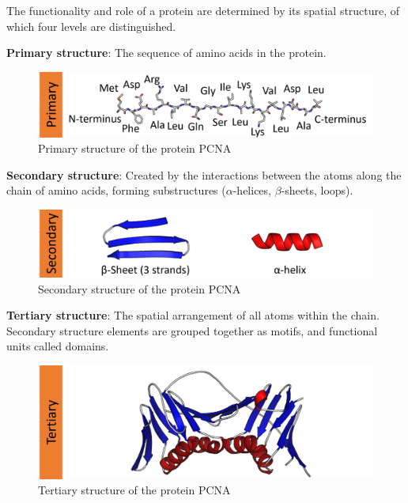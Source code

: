 The functionality and role of a protein are determined by its spatial structure, of which four levels are distinguished.

\textbf{Primary structure}: The sequence of amino acids in the protein.

\begin{figure}[H]
    \centering
    \includegraphics[width=\textwidth]{figures/bioinformatics/protein_structure_primary.png}
    \caption{Primary structure of the protein PCNA\cite{protein_structure}}
\end{figure}

\textbf{Secondary structure}: Created by the interactions between the atoms along the chain of amino acids, forming substructures ($\alpha$-helices, $\beta$-sheets, loops).

\begin{figure}[H]
    \centering
    \includegraphics[width=\textwidth]{figures/bioinformatics/protein_structure_secondary.png}
    \caption{Secondary structure of the protein PCNA\cite{protein_structure}}
\end{figure}

\textbf{Tertiary structure}: The spatial arrangement of all atoms within the chain. Secondary structure elements are grouped together as motifs, and functional units called domains.

\begin{figure}[H]
    \centering
    \includegraphics[width=\textwidth]{figures/bioinformatics/protein_structure_tertiary.png}
    \caption{Tertiary structure of the protein PCNA\cite{protein_structure}}
\end{figure}

